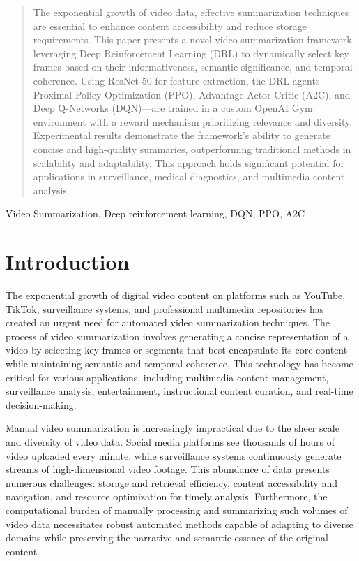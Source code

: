 \documentclass[conference]{IEEEtran}
\begin{document}
\begin{abstract}
The exponential growth of video data, effective summarization techniques are essential to enhance content accessibility and reduce storage requirements. This paper presents a novel video summarization framework leveraging Deep Reinforcement Learning (DRL) to dynamically select key frames based on their informativeness, semantic significance, and temporal coherence. Using ResNet-50 for feature extraction, the DRL agents—Proximal Policy Optimization (PPO), Advantage Actor-Critic (A2C), and Deep Q-Networks (DQN)—are trained in a custom OpenAI Gym environment with a reward mechanism prioritizing relevance and diversity. Experimental results demonstrate the framework's ability to generate concise and high-quality summaries, outperforming traditional methods in scalability and adaptability. This approach holds significant potential for applications in surveillance, medical diagnostics, and multimedia content analysis.
\end{abstract}

\begin{IEEEkeywords}
Video Summarization, Deep reinforcement learning, DQN, PPO, A2C
\end{IEEEkeywords}

\section{Introduction}
The exponential growth of digital video content on platforms such as YouTube, TikTok, surveillance systems, and professional multimedia repositories has created an urgent need for automated video summarization techniques. The process of video summarization involves generating a concise representation of a video by selecting key frames or segments that best encapsulate its core content while maintaining semantic and temporal coherence. This technology has become critical for various applications, including multimedia content management, surveillance analysis, entertainment, instructional content curation, and real-time decision-making.

Manual video summarization is increasingly impractical due to the sheer scale and diversity of video data. Social media platforms see thousands of hours of video uploaded every minute, while surveillance systems continuously generate streams of high-dimensional video footage. This abundance of data presents numerous challenges: storage and retrieval efficiency, content accessibility and navigation, and resource optimization for timely analysis. Furthermore, the computational burden of manually processing and summarizing such volumes of video data necessitates robust automated methods capable of adapting to diverse domains while preserving the narrative and semantic essence of the original content.
\end{document}
